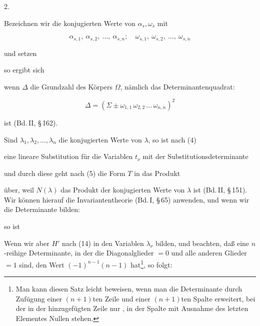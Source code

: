 2. 

Bezeichnen wir die konjugierten Werte von $\alpha_s, \omega_s$ mit

\[
\alpha_{s,1},\ \alpha_{s,2},\ \dots,\ \alpha_{s,n};\quad \omega_{s,1},\ \omega_{s,2},\ \dots,\ \omega_{s,n}
\]

und setzen


so ergibt sich


wenn $\varDelta$ die Grundzahl des Körpers $\Omega$, nämlich das Determinantenquadrat:

\[
\varDelta = (\Sigma \pm \omega_{1,1}\,\omega_{2,2}\,\dots\,\omega_{n,n})^2
\]

ist (Bd.\,II, \S\,162).

Sind $\lambda_1, \lambda_2, \dots, \lambda_n$ die konjugierten Werte von $\lambda$, so ist nach (4)


eine lineare Substitution für die Variablen $t_\nu$ mit der Substitutionsdeterminante


und durch diese geht nach (5) die Form $T$ in das Produkt


über, weil $N(\lambda)$ das Produkt der konjugierten Werte von $\lambda$ ist (Bd.\,II, \S\,151). Wir können hierauf die Invariantentheorie (Bd.\,I, \S\,65) anwenden, und wenn wir die  Determinante bilden:


so ist


Wenn wir aber $H'$ nach (14) in den Variablen $\lambda_\nu$ bilden, und beachten, daß eine $n$-reihige Determinante, in der die Diagonalglieder $=0$ und alle anderen Glieder $=1$ sind, den Wert $(-1)^{n-1}(n-1)$ hat\footnote{Man kann diesen Satz leicht beweisen, wenn man die Determinante durch Zufügung einer $(n+1)$ten Zeile und einer $(n+1)$ten Spalte erweitert, bei der in der hinzugefügten Zeile nur , in der Spalte mit Ausnahme des letzten Elementes Nullen stehen.}, so folgt:
